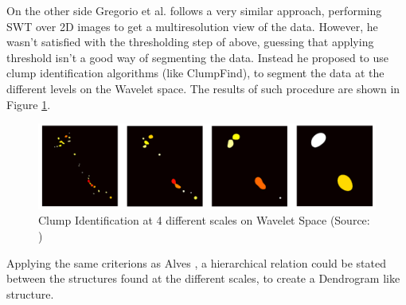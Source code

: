 \documentclass[letter, 11pt]{article}
\begin{document}
\begin{description}
    On the other side Gregorio et al. \cite{Gregorio} follows a very similar approach, performing SWT over 2D images to get a multiresolution view of the data. However, he wasn't satisfied with the thresholding step of above, guessing that applying threshold isn't a good way of segmenting the data. Instead he proposed to use clump identification algorithms (like ClumpFind), to segment the data at the different levels on the Wavelet space. The results of such procedure are shown in Figure \ref{fig:greg}.
    \begin{figure}[htpb!]
    \centering
    \includegraphics[width=12cm]{greg}
    \caption{Clump Identification at 4 different scales on Wavelet Space (Source: \cite{Gregorio})}
    \label{fig:greg}
    \end{figure}
    Applying the same criterions as Alves \cite{Alves}, a hierarchical relation could be stated between the structures found at the different scales, to create a Dendrogram like structure.
\end{description}




\newpage
\end{document}
